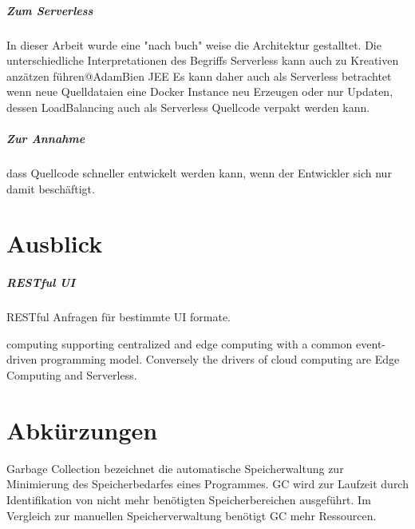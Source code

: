 \documentclass[
12pt,
english,
ngerman,
headsepline,
twoside,
openright,
numbers=noenddot,version=first
]{scrreprt}
\begin{document}
\paragraph{Zum Serverless}
In dieser Arbeit wurde eine "nach buch" weise die Architektur gestalltet. Die unterschiedliche Interpretationen des Begriffs Serverless kann auch zu Kreativen anzätzen führen@AdamBien JEE
Es kann daher auch als Serverless betrachtet wenn neue Quelldataien eine Docker Instance neu Erzeugen oder nur Updaten, dessen LoadBalancing auch als Serverless Quellcode verpakt werden kann. 

\paragraph{Zur Annahme} dass Quellcode schneller entwickelt werden kann, wenn der Entwickler sich nur damit beschäftigt.

\chapter{Ausblick}


\paragraph{RESTful UI}
RESTful Anfragen für bestimmte UI formate.



computing supporting centralized
and edge computing with a common event-driven programming model. Conversely the
drivers of cloud computing are Edge Computing and Serverless.

\lstlistoflistings


\listoftables


\chapter*{Abkürzungen}


\begin{acronym}[Bash]



\glqq Garbage Collection\grqq{} bezeichnet die automatische Speicherwaltung zur Minimierung des Speicherbedarfes eines Programmes.
\ac{GC} wird zur Laufzeit durch Identifikation von nicht mehr benötigten Speicherbereichen ausgeführt.
Im Vergleich zur manuellen Speicherverwaltung benötigt \ac{GC} mehr Ressourcen.

\end{acronym}



\end{document}
